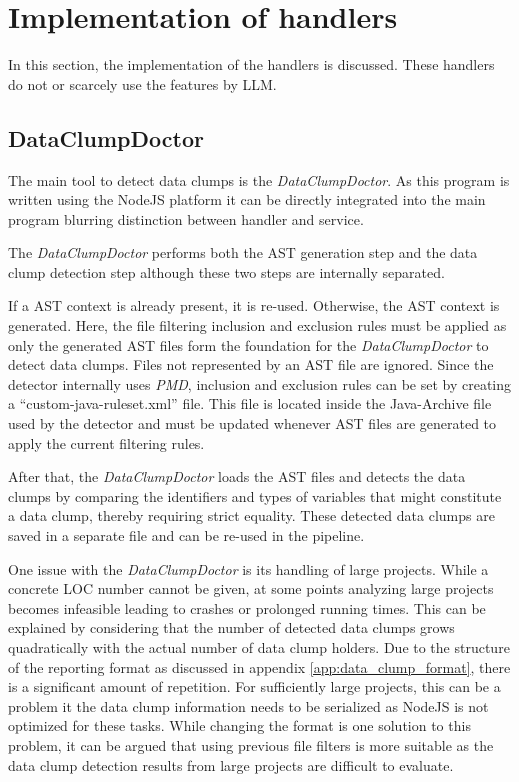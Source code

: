 \section{Implementation of handlers} \label{sec:step_impl}
In this section, the implementation of the handlers is discussed. These handlers do not or scarcely use the features by \ac{LLM}. 
\subsection{DataClumpDoctor}

The main tool to detect  data clumps is the \textit{DataClumpDoctor}. As this program is written using the NodeJS platform it can be directly integrated into the main program blurring distinction between handler and service.

The \textit{DataClumpDoctor} performs both the \ac{AST} generation step and the data clump detection step although these two steps are internally separated.

If a \ac{AST} context is already present, it is re-used. Otherwise, the \ac{AST} context is generated. Here, the file filtering inclusion and exclusion rules must be applied as only the generated \ac{AST} files form the foundation for the \textit{DataClumpDoctor} to detect data clumps. Files  not represented by an \ac{AST} file are ignored. Since the detector internally uses \textit{PMD}, inclusion and exclusion rules can be set by creating a \enquote{custom-java-ruleset.xml} file. This file is located inside the Java-Archive file used by the detector and must be updated whenever \ac{AST} files are generated to apply the current filtering rules. 

After that, the \textit{DataClumpDoctor} loads the \ac{AST} files and detects the data clumps by comparing the identifiers and types of variables that might constitute a data clump, thereby requiring strict equality. These detected data clumps are saved in a separate file and can be re-used in the pipeline. 

One issue with the \textit{DataClumpDoctor} is its handling of large projects. While a concrete \ac{LOC} number cannot be given, at some points analyzing large projects becomes infeasible leading to crashes or prolonged running times. This can be explained by considering that  the number of detected data clumps grows quadratically with the actual number of data clump holders. Due to the structure of the reporting format as discussed in appendix \ref{app:data_clump_format}, there is a significant amount of repetition. For sufficiently large projects, this can be a problem it the data clump information needs to be serialized as NodeJS is not optimized for these tasks. While changing the format is one solution to this problem, it can be argued that using previous file filters is more suitable as the data clump detection results from large projects are difficult to evaluate. 

